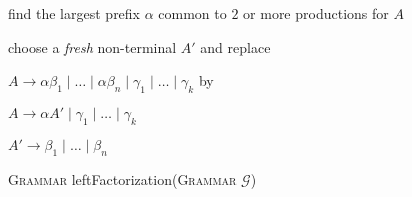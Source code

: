 \documentclass{standalone}
\begin{document}
    \begin{algorithm}[H]
        \label{alg:left-fact}
        \DontPrintSemicolon


        
         {
             {
                find the largest prefix \(\alpha\) common to \(2\) or more productions for \(A\)\;
                \If{\(\alpha \ne \varepsilon\)} {
                    choose a \emph{fresh} non-terminal \(A'\) and replace
                    
                    \(A \to \alpha \beta_1 \mid \ldots \mid \alpha \beta_n \mid \gamma_1 \mid \ldots \mid \gamma_k\) by
                    
                    \(A \to \alpha A' \mid \gamma_1 \mid \ldots \mid \gamma_k\)
                    
                    \(A' \to \beta_1 \mid \ldots \mid \beta_n\)
                }
            }
        }

        \caption{\textsc{Grammar} leftFactorization(\textsc{Grammar} \(\mathcal{G}\))}
    \end{algorithm}
\end{document}
